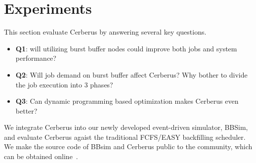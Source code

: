 \section{Experiments}
\label{Sec:Experiments}


This section evaluate Cerberus by answering several key questions.
\begin{itemize}
        \item \textbf{Q1}: will utilizing burst buffer nodes could improve both jobs and system performance?
        \item \textbf{Q2}: Will job demand on burst buffer affect Cerberus?
                Why bother to divide the job execution into 3 phases?
        \item \textbf{Q3}: Can dynamic programming based optimization
                makes Cerberus even better?
\end{itemize}
We integrate Cerberus into our newly developed event-driven simulator, 
BBSim, and evaluate Cerberus agaist the traditional FCFS/EASY backfilling scheduler.
We make the source code of BBsim and Cerberus public to the community,
which can be obtained online~\cite{bbsim-repo}.


